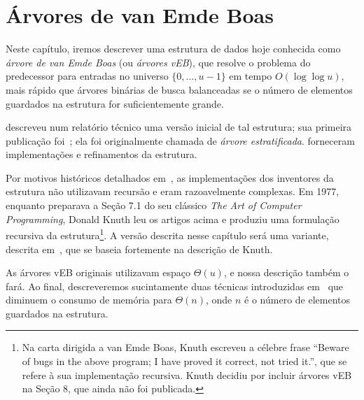 \chapter{Árvores de van Emde Boas}
\label{cap:veb}

Neste capítulo, iremos descrever uma estrutura de dados hoje conhecida como
\emph{árvore de van Emde Boas} (ou \emph{árvores vEB}), que resolve o problema
do predecessor para entradas no universo $\{0, \ldots, u-1\}$ em tempo $O(\log
\log u)$, mais rápido que árvores binárias de busca balanceadas se o número de
elementos guardados na estrutura for suficientemente grande. 

\cite{vEB74} descreveu num relatório técnico uma versão inicial de tal
estrutura; sua primeira publicação foi~\cite{vEB75}; ela foi originalmente
chamada de \emph{árvore estratificada}. \cite{vEB77} forneceram implementações e
refinamentos da estrutura.

Por motivos históricos detalhados em~\cite{vEB13}, as implementações dos
inventores da estrutura não utilizavam recursão e eram razoavelmente complexas.
Em 1977, enquanto preparava a Seção 7.1 do seu clássico \emph{The Art of
Computer Programming}, Donald Knuth leu os artigos acima e produziu uma
formulação recursiva da estrutura\footnote{Na carta dirigida a van Emde Boas,
Knuth escreveu a célebre frase ``Beware of bugs in the above program; I have
proved it correct, not tried it.'', que se refere à sua implementação recursiva.
Knuth decidiu por incluir árvores vEB na Seção 8, que ainda não foi publicada.}.
A versão descrita nesse capítulo será uma variante, descrita
em~\cite{NotasDemaine}, que se baseia fortemente na descrição de Knuth.

As árvores vEB originais utilizavam espaço $\Theta(u)$, e nossa descrição também o fará.
Ao final, descreveremos sucintamente duas técnicas introduzidas
em~\cite{vEBLinearSpace} que diminuem o consumo de memória para $\Theta(n)$,
onde $n$ é o número de elementos guardados na estrutura.


